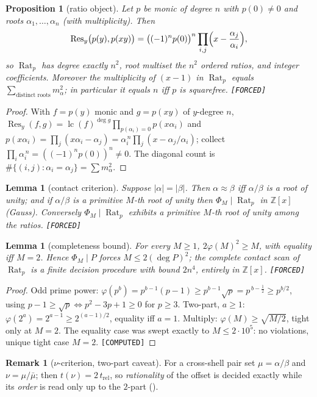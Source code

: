 \documentclass[11pt]{article}
\newcommand{\F}{\textnormal{\texttt{[FORCED]}}}
\newcommand{\C}{\textnormal{\texttt{[COMPUTED]}}}
\newcommand{\Z}{\mathbb{Z}}
\newcommand{\Rat}{\operatorname{Rat}}
\newcommand{\Res}{\operatorname{Res}}
\newcommand{\lc}{\operatorname{lc}}
\newtheorem{lemma}[theorem]{Lemma}
\newtheorem{proposition}[theorem]{Proposition}
\theoremstyle{definition}
\newtheorem{remark}[theorem]{Remark}
\begin{document}
\begin{proposition}[ratio object]\label{prop:rat}
Let $p$ be monic of degree $n$ with $p(0)\neq0$ and roots $\alpha_1,\dots,\alpha_n$
(with multiplicity). Then
\[
\Res_y\bigl(p(y),p(xy)\bigr)
=\bigl((-1)^n p(0)\bigr)^{n}\prod_{i,j}\Bigl(x-\frac{\alpha_j}{\alpha_i}\Bigr),
\]
so $\Rat_p$ has degree exactly $n^2$, root multiset the $n^2$ ordered ratios,
and integer coefficients. Moreover the multiplicity of $(x-1)$ in $\Rat_p$
equals $\sum_{\text{distinct roots}}m_\alpha^{2}$; in particular it equals $n$
iff $p$ is squarefree. \F
\end{proposition}

\begin{proof}
With $f=p(y)$ monic and $g=p(xy)$ of $y$-degree $n$,
$\Res_y(f,g)=\lc(f)^{\deg g}\prod_{p(\alpha_i)=0}p(x\alpha_i)$ and
$p(x\alpha_i)=\prod_j(x\alpha_i-\alpha_j)=\alpha_i^{\,n}\prod_j(x-\alpha_j/\alpha_i)$;
collect $\prod_i\alpha_i^{\,n}=((-1)^np(0))^n\neq0$. The diagonal count is
$\#\{(i,j):\alpha_i=\alpha_j\}=\sum m_\alpha^2$.
\end{proof}

\begin{lemma}[contact criterion]\label{lem:contact}
Suppose $|\alpha|=|\beta|$. Then $\alpha\approx\beta$ iff $\alpha/\beta$ is a
root of unity; and if $\alpha/\beta$ is a primitive $M$-th root of unity then
$\Phi_M\mid\Rat_p$ in $\Z[x]$ (Gauss). Conversely $\Phi_M\mid\Rat_p$ exhibits a
primitive $M$-th root of unity among the ratios. \F
\end{lemma}

\begin{lemma}[completeness bound]\label{lem:totient}
For every $M\ge1$, $2\varphi(M)^2\ge M$, with equality iff $M=2$. Hence
$\Phi_M\mid P$ forces $M\le 2(\deg P)^2$; the complete contact scan of $\Rat_p$
is a finite decision procedure with bound $2n^4$, entirely in $\Z[x]$. \F
\end{lemma}

\begin{proof}
Odd prime power: $\varphi(p^b)=p^{b-1}(p-1)\ge p^{b-1}\sqrt{p}=p^{\,b-\frac12}\ge p^{b/2}$,
using $p-1\ge\sqrt p\iff p^2-3p+1\ge0$ for $p\ge3$. Two-part, $a\ge1$:
$\varphi(2^a)=2^{a-1}\ge 2^{(a-1)/2}$, equality iff $a=1$. Multiply:
$\varphi(M)\ge\sqrt{M/2}$, tight only at $M=2$. The equality case was swept
exactly to $M\le 2\cdot10^{5}$: no violations, unique tight case $M=2$. \C
\end{proof}

\begin{remark}[$\nu$-criterion, two-part caveat]\label{rem:nu2part}
For a cross-shell pair set $\mu=\alpha/\beta$ and $\nu=\mu/\bar\mu$; then
$t(\nu)=2\,t_{\mathrm{rel}}$, so \emph{rationality} of the offset is decided
exactly while its \emph{order} is read only up to the $2$-part
(\cite[Rem.~7.6]{relcharge}).
\end{remark}
\end{document}
